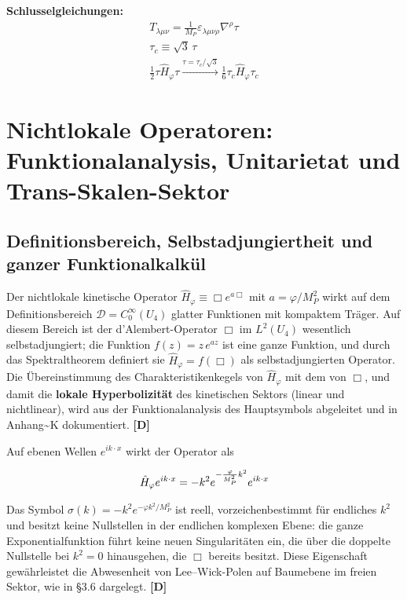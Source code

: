 ﻿\documentclass[11pt,letterpaper]{article}
\begin{document}
\textbf{Schlusselgleichungen:}
\begin{align*}
    T_{\lambda\mu\nu} = \frac{1}{M_P}\varepsilon_{\lambda\mu\nu\rho}\nabla^{\rho}\tau \\
    \tau_c \equiv \sqrt{3}\,\tau \\
    \frac{1}{2}\tau\hat{H}_\varphi\tau \xrightarrow{\tau=\tau_c/\sqrt{3}} \frac{1}{6}\tau_c\hat{H}_\varphi\tau_c
\end{align*}
\section{Nichtlokale Operatoren: Funktionalanalysis, Unitarietat und Trans-Skalen-Sektor}
\subsection{Definitionsbereich, Selbstadjungiertheit und ganzer Funktionalkalkül}
Der nichtlokale kinetische Operator $\hat{H}_\varphi \equiv \Box e^{a\Box}$ mit $a = \varphi/M_P^2$ wirkt auf dem Definitionsbereich $\mathcal{D} = C_0^\infty(U_4)$ glatter Funktionen mit kompaktem Träger. Auf diesem Bereich ist der d'Alembert-Operator $\Box$ im $L^2(U_4)$ wesentlich selbstadjungiert; die Funktion $f(z) = z\,e^{az}$ ist eine ganze Funktion, und durch das Spektraltheorem definiert sie $\hat{H}_\varphi = f(\Box)$ als selbstadjungierten Operator. Die Übereinstimmung des Charakteristikenkegels von $\hat{H}_\varphi$ mit dem von $\Box$, und damit die \textbf{lokale Hyperbolizität} des kinetischen Sektors (linear und nichtlinear), wird aus der Funktionalanalysis des Hauptsymbols abgeleitet und in Anhang\textasciitilde{}K dokumentiert. \textbf{[D]}

Auf ebenen Wellen $e^{ik\cdot x}$ wirkt der Operator als

\begin{equation*}
  \resizebox{\ifdim\width>\linewidth \linewidth\else\width\fi}{!}{$\displaystyle \hat{H}_\varphi e^{ik\cdot x} = -k^2 e^{-\frac{\varphi}{M_P^2}k^2}e^{ik\cdot x}$}
\end{equation*}

Das Symbol $\sigma(k) = -k^2 e^{-\varphi k^2/M_P^2}$ ist reell, vorzeichenbestimmt für endliches $k^2$ und besitzt keine Nullstellen in der endlichen komplexen Ebene: die ganze Exponentialfunktion führt keine neuen Singularitäten ein, die über die doppelte Nullstelle bei $k^2 = 0$ hinausgehen, die $\Box$ bereits besitzt. Diese Eigenschaft gewährleistet die Abwesenheit von Lee--Wick-Polen auf Baumebene im freien Sektor, wie in §3.6 dargelegt. \textbf{[D]}
\end{document}
